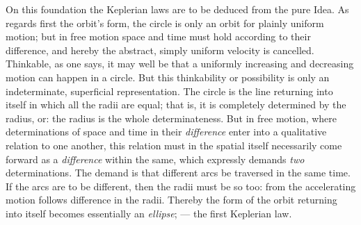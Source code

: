 \documentclass[12pt,a4paper]{book}
\begin{document}
On this foundation the Keplerian laws are to be deduced from the pure Idea. As regards first the orbit's
form, the circle is only an orbit for plainly uniform motion; but in free motion space and time must hold
according to their difference, and hereby the abstract, simply uniform velocity is cancelled. Thinkable, as
one says, it may well be that a uniformly increasing and decreasing motion can happen in a circle. But this
thinkability or possibility is only an indeterminate, superficial representation. The circle is the line
returning into itself in which all the radii are equal; that is, it is completely determined by the radius,
or: the radius is the whole determinateness.
But in free motion, where determinations of space and time in their \emph{difference} enter into a
qualitative relation to one another, this relation must in the spatial itself necessarily come forward as a
\emph{difference} within the same, which expressly demands \emph{two} determinations. The demand is that
different arcs be traversed in the same time. If the arcs are to be different, then the radii must be so
too: from the accelerating motion follows difference in the radii. Thereby the form of the orbit returning
into itself becomes essentially an \emph{ellipse}; --- the first Keplerian law.
\end{document}
